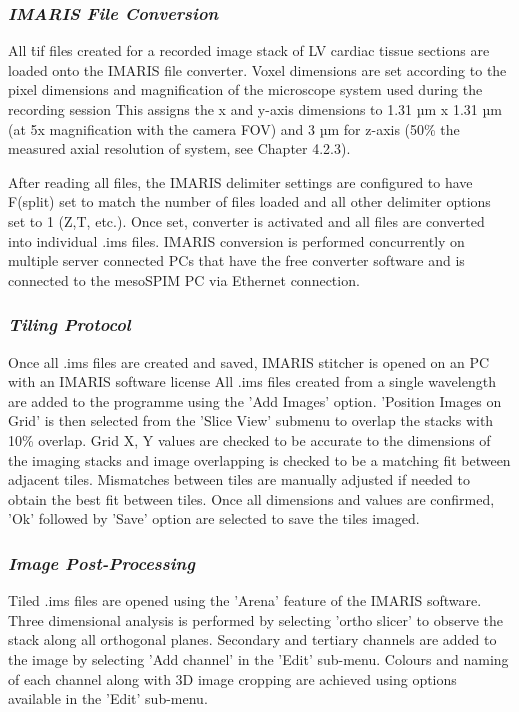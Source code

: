 \subsubsection{\textit{IMARIS File Conversion}}
All \.tif files created for a recorded image stack of LV cardiac tissue sections are loaded onto the IMARIS file converter. Voxel dimensions are set according to the pixel dimensions and magnification of the microscope system used during the recording session This assigns the x and y-axis dimensions  to 1.31 µm x 1.31 µm (at 5x magnification with the camera FOV) and 3 µm for z-axis (50\% the measured axial resolution of system, see Chapter 4.2.3). 

After reading all files, the IMARIS delimiter settings are configured to have F(split) set to match the number of files loaded and all other delimiter options set to 1 (Z,T, etc.). Once set, converter is activated and all files are converted into individual .ims files. IMARIS conversion is performed concurrently on multiple server connected PCs that have the free converter software and is connected to the mesoSPIM PC via Ethernet connection.

\subsubsection{\textit{Tiling Protocol}}
Once all .ims files are created and saved, IMARIS stitcher is opened on an PC with an IMARIS software license All .ims files created from a single wavelength are added to the programme using the 'Add Images' option. 'Position Images on Grid' is then selected from the 'Slice View' submenu to overlap the stacks with 10\% overlap. Grid X, Y values are checked to be accurate to the dimensions of the imaging stacks and image overlapping is checked to be a matching fit between adjacent tiles. Mismatches between tiles are manually adjusted if needed to obtain the best fit between tiles. Once all dimensions and values are confirmed, 'Ok' followed by 'Save' option are selected to save the tiles imaged.   


\subsubsection{\textit{Image Post-Processing}}
Tiled .ims files are opened using the 'Arena' feature of the IMARIS software. Three dimensional analysis is performed by selecting 'ortho slicer' to observe the stack along all orthogonal planes. Secondary and tertiary channels are added to the image by selecting 'Add channel' in the 'Edit' sub-menu. Colours and naming of each channel along with 3D image cropping are achieved using options available in the 'Edit' sub-menu.

